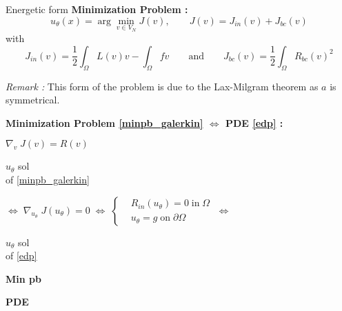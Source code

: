 \begin{frame}{Energetic form}
	\textbf{Minimization Problem :}
	\begin{equation}
		u_\theta(x)=\arg\min_{v\in V_N} J(v), \qquad J(v)=J_{in}(v)+J_{bc}(v)\label{minpb_galerkin}
	\end{equation}
	with 
	\begin{equation*}
		J_{in}(v)=\frac{1}{2}\int_\Omega L(v)v - \int_\Omega fv  \qquad \text{and} \qquad J_{bc}(v)=\frac{1}{2}\int_\Omega R_{bc}(v)^2
	\end{equation*}

	\footnotesize	
	\textit{Remark :} This form of the problem is due to the Lax-Milgram theorem as $a$ is symmetrical.
	\normalsize
	
	\footnotesize
	\begin{center}
		\begin{tcolorbox}[
			colback=white, %
			colframe=other, %
			arc=2mm, %
			boxrule=0.5pt, %
			breakable, enhanced jigsaw,
			width=0.8\linewidth
			]
			
			\textbf{Minimization Problem \eqref{minpb_galerkin} $\Leftrightarrow$ PDE \eqref{edp} :}
			
			\centering
			$\nabla_v \; J(v)=R(v) \qquad $  
			
			\vspace{5pt}
			
			\begin{minipage}{0.1\linewidth}
				\centering
				$u_\theta$ sol \\
				of \eqref{minpb_galerkin}
			\end{minipage} $\Leftrightarrow \; \nabla_{u_\theta} \; J(u_\theta)=0 \; \Leftrightarrow \; \left\{\begin{aligned}
				&R_{in}(u_\theta)=0 \; \text{in} \; \Omega \\
				&u_\theta=g \; \text{on} \; \partial\Omega
			\end{aligned}\right. \; \Leftrightarrow$ \begin{minipage}{0.1\linewidth}
				\centering
				$u_\theta$ sol \\
				of \eqref{edp}
			\end{minipage}
		
			\vspace{5pt}
			
			\begin{minipage}{0.1\linewidth}
				\centering
				\textbf{Min pb}
			\end{minipage} \; \hspace{150pt} \; \begin{minipage}{0.1\linewidth}
				\centering
				\textbf{PDE}
			\end{minipage}
		\end{tcolorbox}
	\end{center}
\end{frame}

